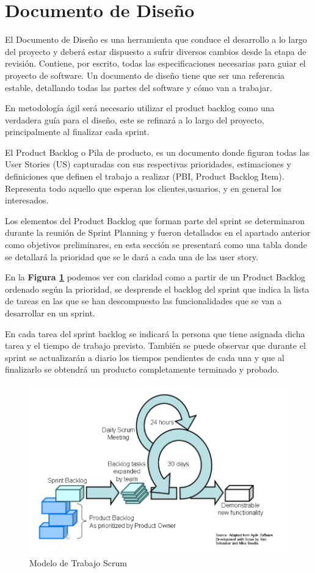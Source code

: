 
\section{Documento de Diseño}

El Documento de Diseño es una herramienta que conduce el desarrollo a lo largo del proyecto y deberá estar dispuesto a sufrir diversos cambios desde la etapa de revisión. Contiene, por escrito, todas las especificaciones necesarias para guiar el proyecto de software. Un documento de diseño tiene que ser una referencia estable, detallando todas las partes del software y cómo van a trabajar.

En metodología ágil será necesario utilizar el product backlog como una verdadera guía para el diseño, este se refinará a lo largo del proyecto, principalmente al finalizar cada sprint.

El Product Backlog o Pila de producto, es un documento donde figuran todas las User Stories (US) capturadas con sus respectivas prioridades, estimaciones y definiciones que definen el  trabajo a realizar (PBI, Product Backlog Item).
Representa todo aquello que esperan los clientes,usuarios, y en general los interesados.

Los elementos del Product Backlog que forman parte del sprint se determinaron durante la reunión de Sprint Planning y fueron detallados en el apartado anterior como objetivos preliminares, en esta sección se presentará como una tabla donde se detallará la prioridad que se le dará a cada una de las user story.

En la \textbf{Figura \ref{scrum}} podemos ver con claridad como a partir de un Product Backlog ordenado según la prioridad, se desprende el backlog del sprint que indica la lista de tareas en las que se han descompuesto las funcionalidades que se van a desarrollar en un sprint. 

En cada tarea del sprint backlog se indicará la persona que tiene asignada dicha tarea y el tiempo de trabajo previsto. También se puede observar que durante el sprint se actualizarán a diario los tiempos pendientes de cada una y que al finalizarlo se obtendrá un producto completamente terminado y probado.
\begin{figure}[h]
  \centering
  \includegraphics[width=.8\textwidth]{img/tp1_parte2/scrum}
  \caption{Modelo de Trabajo Scrum}
  \label{scrum}
\end{figure}

